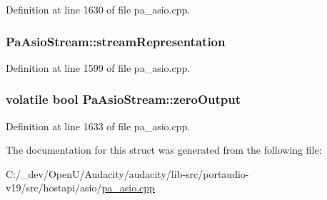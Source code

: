 Definition at line 1630 of file pa\+\_\+asio.\+cpp.

\subsubsection[{\texorpdfstring{stream\+Representation}{streamRepresentation}}]{ Pa\+Asio\+Stream\+::stream\+Representation}\hypertarget{struct_pa_asio_stream_ac67b5dffdcbfde1debd7dfca34e8a526}{}\label{struct_pa_asio_stream_ac67b5dffdcbfde1debd7dfca34e8a526}


Definition at line 1599 of file pa\+\_\+asio.\+cpp.

\subsubsection[{\texorpdfstring{zero\+Output}{zeroOutput}}]{\setlength{\rightskip}{0pt plus 5cm}volatile {\bf bool} Pa\+Asio\+Stream\+::zero\+Output}\hypertarget{struct_pa_asio_stream_aa21c6cf2c250d832d8e6022347701230}{}\label{struct_pa_asio_stream_aa21c6cf2c250d832d8e6022347701230}


Definition at line 1633 of file pa\+\_\+asio.\+cpp.



The documentation for this struct was generated from the following file\+:\begin{DoxyCompactItemize}
\item 
C\+:/\+\_\+dev/\+Open\+U/\+Audacity/audacity/lib-\/src/portaudio-\/v19/src/hostapi/asio/\hyperlink{pa__asio_8cpp}{pa\+\_\+asio.\+cpp}\end{DoxyCompactItemize}
